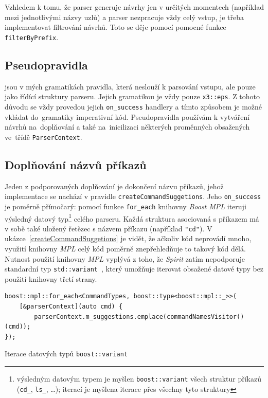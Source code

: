 \documentclass[thesis=B,czech,hidelinks]{FITthesis}[2019/03/06]
\begin{document}
Vzhledem k tomu, že parser generuje návrhy jen v určitých momentech (například mezi jednotlivými názvy uzlů) a parser nezpracuje vždy celý vstup, je třeba implementovat filtrování návrhů. Toto se děje pomocí pomocné funkce \texttt{filterByPrefix}.

\subsection{Pseudopravidla}
 jsou v mých gramatikách pravidla, která neslouží k parsování vstupu, ale pouze jako řídící struktury parseru. Jejich gramatikou je vždy pouze \texttt{x3::eps}. Z tohoto důvodu se vždy provedou jejich \texttt{on\_success} handlery a tímto způsobem je možné vkládat do~gramatiky imperativní kód. Pseudopravidla používám k vytváření návrhů na~doplňování a také na~inicilizaci některých proměnných obsažených ve~třídě \texttt{ParserContext}.


\subsection{Doplňování názvů příkazů}\label{completing:commands}
Jeden z podporovaných doplňování je dokončení názvu příkazů, jehož implementace se nachází v pravidle \texttt{createCommandSuggetions}. Jeho \texttt{on\_success} je poměrně přímočarý: pomocí funkce \texttt{for\_each} knihovny \textit{Boost MPL}\cite{boost:mpl} iteruji výsledný datový typ\footnote{výsledným datovým typem je myšlen \texttt{boost::variant} všech struktur příkazů (\texttt{cd\_}, \texttt{ls\_}, \ldots); iterací je myšlena iterace přes všechny tyto struktury} celého parseru. Každá struktura asociovaná s příkazem má v sobě také uložený řetězec s názvem příkazu (například \verb¨"cd"¨). V ukázce~\ref{createCommandSuggetions} je vidět, že ačkoliv kód neprovádí mnoho, využití knihovny \textit{MPL} celý kód poměrně znepřehledňuje to takový kód dělá. Nutnost použití knihovny \textit{MPL} vyplývá z toho, že \textit{Spirit} zatím nepodporuje standardní typ \texttt{std::variant}~\cite{boost-variant}, který umožňuje iterovat obsažené datové typy bez použití knihovny třetí strany.

\begin{listing}
\begin{verbatim}
boost::mpl::for_each<CommandTypes, boost::type<boost::mpl::_>>(
    [&parserContext](auto cmd) {
        parserContext.m_suggestions.emplace(commandNamesVisitor()(cmd));
});
\end{verbatim}
\caption{Iterace datových typů \texttt{boost::variant}}\label{createCommandSuggetions}
\end{listing}
\end{document}

